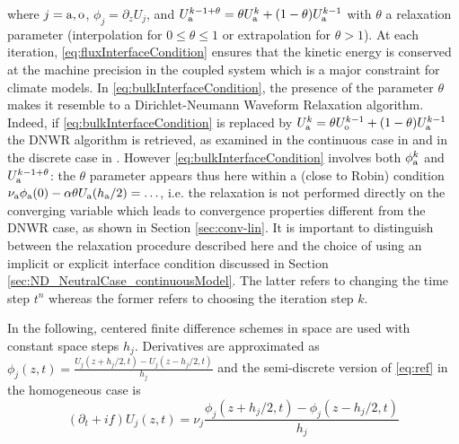%
where $j={\rm a},{\rm o}$, $\phi_j = \partial_z U_j$, and 
$U_{\rm a}^{k-1+\theta} = \theta U_{\rm a}^{k} + (1-\theta) U_{\rm a}^{k-1}$
with $\theta$ a relaxation parameter (interpolation for $0\leq \theta \leq 1$ or extrapolation for $\theta>1$). 
%
%
At each iteration, \eqref{eq:fluxInterfaceCondition} ensures that the 
kinetic energy is conserved at the machine precision in the coupled 
system which is a major constraint for climate models. 
In \eqref{eq:bulkInterfaceCondition},
the presence of the parameter $\theta$ makes it resemble to a Dirichlet-Neumann Waveform Relaxation algorithm.
Indeed, if \eqref{eq:bulkInterfaceCondition} is replaced
by $U_{\rm a}^k = \theta U_{\rm o}^{k-1} + (1-\theta) U_{\rm a}^{k-1}$ the DNWR algorithm is retrieved, as examined in the continuous case in \cite{gander_dirichlet-neumann_2014} and in the discrete case in
\cite{meisrimel_time_2020}.
However \eqref{eq:bulkInterfaceCondition}
involves both $\phi_{\rm a}^k$ and 
$U_{\rm a}^{k-1+\theta}$:
the $\theta$ parameter appears thus here within a (close to Robin) condition  
$\nu_{\rm a} \phi_{\rm a}(0) - \alpha \theta U_{\rm a}(h_{\rm a}/2) = \ldots$,
i.e. the relaxation is not performed directly on the converging variable
which leads to convergence properties different from the DNWR case, 
as shown in Section \ref{sec:conv-lin}.
It is important to distinguish between the relaxation
procedure described here and the choice of using an implicit or
explicit interface condition discussed in Section
\ref{sec:ND_NeutralCase_continuousModel}.
The latter refers to changing the time step $t^n$ whereas the former
refers to choosing the iteration step $k$.
\par
%
In the following, centered finite difference schemes in space are used with constant space steps $h_j$.
Derivatives are approximated as $\phi_j(z,t) = \frac{U_j(z+h_j/2,t) - U_j(z-h_j/2, t)}{h_j}$
and the semi-discrete version of \eqref{eq:ref} in the homogeneous case is
\begin{equation}\label{eq:spaceTimeScheme}
(\partial_t + if) U_j (z, t) = \nu_j \frac{\phi_j(z+h_j/2,t) - \phi_j(z-h_j/2,t)}{h_j}
\end{equation}

